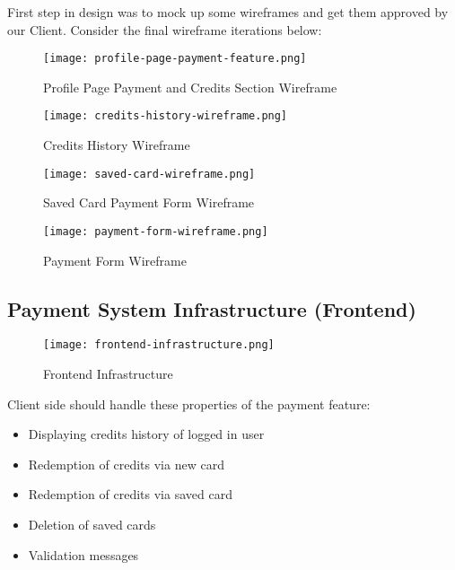First step in design was to mock up some wireframes and get them approved by our Client. Consider the final wireframe iterations below:\\

\begin{figure}[!hbt]
  	\centering
 	\texttt{[image: profile-page-payment-feature.png]}
  	\caption{Profile Page Payment and Credits Section Wireframe}
 	\label{fig:profile-wireframe}
\end{figure}

\begin{figure}[!hbt]
  	\centering
 	\texttt{[image: credits-history-wireframe.png]}
  	\caption{Credits History Wireframe}
 	\label{fig:credits-history-wireframe}
\end{figure}

\begin{figure}[!hbt]
  	\centering
 	\texttt{[image: saved-card-wireframe.png]}
  	\caption{Saved Card Payment Form Wireframe}
 	\label{fig:saved-card-wireframe}
\end{figure}

\begin{figure}[!hbt]
  	\centering
 	\texttt{[image: payment-form-wireframe.png]}
  	\caption{Payment Form Wireframe}
 	\label{fig:payment-form-wireframe}
\end{figure}

\subsection{Payment System Infrastructure (Frontend)}
\label{subsec:payment-system-infrastructure}

\begin{figure}[!hbt]
  	\centering
 	\texttt{[image: frontend-infrastructure.png]}
  	\caption{Frontend Infrastructure}
 	\label{fig:frontend-infrastructure-diagram}
\end{figure}

Client side should handle these properties of the payment feature:

\begin{itemize}
\item Displaying credits history of logged in user
\item Redemption of credits via new card
\item Redemption of credits via saved card
\item Deletion of saved cards
\item Validation messages
\end{itemize}

